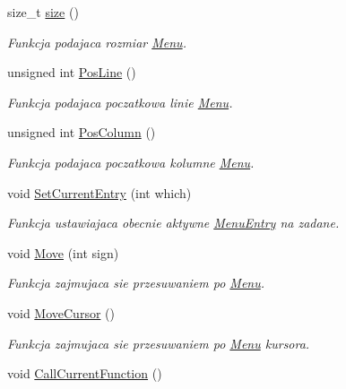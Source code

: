 \begin{DoxyCompactItemize}
size\+\_\+t \hyperlink{class_menu_a79efb8be5c70958590c886e4b988c36a}{size} ()
\begin{DoxyCompactList}\small\item\em Funkcja podajaca rozmiar \hyperlink{class_menu}{Menu}. \end{DoxyCompactList}\item 
unsigned int \hyperlink{class_menu_a5cd3d248fdd22d045b7689cb8b558a5c}{Pos\+Line} ()
\begin{DoxyCompactList}\small\item\em Funkcja podajaca poczatkowa linie \hyperlink{class_menu}{Menu}. \end{DoxyCompactList}\item 
unsigned int \hyperlink{class_menu_a206bfce5dab4f8170bfd3e22ef47613b}{Pos\+Column} ()
\begin{DoxyCompactList}\small\item\em Funkcja podajaca poczatkowa kolumne \hyperlink{class_menu}{Menu}. \end{DoxyCompactList}\item 
void \hyperlink{class_menu_a4c7a6ae76ffe0de91b9948b033984f54}{Set\+Current\+Entry} (int which)
\begin{DoxyCompactList}\small\item\em Funkcja ustawiajaca obecnie aktywne \hyperlink{class_menu_entry}{Menu\+Entry} na zadane. \end{DoxyCompactList}\item 
void \hyperlink{class_menu_a2538dd9ab4e5f0613b7c47b4a6fbbe96}{Move} (int sign)
\begin{DoxyCompactList}\small\item\em Funkcja zajmujaca sie przesuwaniem po \hyperlink{class_menu}{Menu}. \end{DoxyCompactList}\item 
\hypertarget{class_menu_a882bc77032049522a968ebb959060951}{}void \hyperlink{class_menu_a882bc77032049522a968ebb959060951}{Move\+Cursor} ()\label{class_menu_a882bc77032049522a968ebb959060951}

\begin{DoxyCompactList}\small\item\em Funkcja zajmujaca sie przesuwaniem po \hyperlink{class_menu}{Menu} kursora. \end{DoxyCompactList}\item 
\hypertarget{class_menu_ae22e08593df3fe9cb33ffae4e71386b9}{}void \hyperlink{class_menu_ae22e08593df3fe9cb33ffae4e71386b9}{Call\+Current\+Function} ()\label{class_menu_ae22e08593df3fe9cb33ffae4e71386b9}


\end{DoxyCompactItemize}

